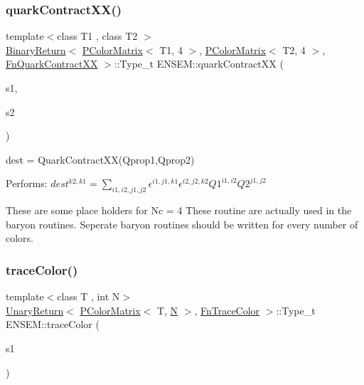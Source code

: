 \subsubsection{\texorpdfstring{quarkContractXX()}{quarkContractXX()}\hspace{0.1cm}{\footnotesize\ttfamily [4/4]}}
{\footnotesize\ttfamily template$<$class T1 , class T2 $>$ \\
\mbox{\hyperlink{structENSEM_1_1BinaryReturn}{Binary\+Return}}$<$ \mbox{\hyperlink{classENSEM_1_1PColorMatrix}{P\+Color\+Matrix}}$<$ T1, 4 $>$, \mbox{\hyperlink{classENSEM_1_1PColorMatrix}{P\+Color\+Matrix}}$<$ T2, 4 $>$, \mbox{\hyperlink{structENSEM_1_1FnQuarkContractXX}{Fn\+Quark\+Contract\+XX}} $>$\+::Type\+\_\+t E\+N\+S\+E\+M\+::quark\+Contract\+XX (\begin{DoxyParamCaption}\item[{const \mbox{\hyperlink{classENSEM_1_1PColorMatrix}{P\+Color\+Matrix}}$<$ T1, 4 $>$ \&}]{s1,  }\item[{const \mbox{\hyperlink{classENSEM_1_1PColorMatrix}{P\+Color\+Matrix}}$<$ T2, 4 $>$ \&}]{s2 }\end{DoxyParamCaption})\hspace{0.3cm}{\ttfamily [inline]}}



dest = Quark\+Contract\+X\+X(\+Qprop1,\+Qprop2) 

Performs\+: $dest^{k2,k1} = \sum_{i1,i2,j1,j2} \epsilon^{i1,j1,k1}\epsilon^{i2,j2,k2} Q1^{i1,i2} Q2^{j1,j2}$

These are some place holders for Nc = 4 These routine are actually used in the baryon routines. Seperate baryon routines should be written for every number of colors. \mbox{\label{group__primcolormatrix_ga00fd94578bee0c90e298c41c144c15ee}} 
\subsubsection{\texorpdfstring{traceColor()}{traceColor()}}
{\footnotesize\ttfamily template$<$class T , int N$>$ \\
\mbox{\hyperlink{structENSEM_1_1UnaryReturn}{Unary\+Return}}$<$ \mbox{\hyperlink{classENSEM_1_1PColorMatrix}{P\+Color\+Matrix}}$<$ T, \mbox{\hyperlink{adat__devel_2lib_2hadron_2operator__name__util_8cc_a7722c8ecbb62d99aee7ce68b1752f337}{N}} $>$, \mbox{\hyperlink{structENSEM_1_1FnTraceColor}{Fn\+Trace\+Color}} $>$\+::Type\+\_\+t E\+N\+S\+E\+M\+::trace\+Color (\begin{DoxyParamCaption}\item[{const \mbox{\hyperlink{classENSEM_1_1PColorMatrix}{P\+Color\+Matrix}}$<$ T, \mbox{\hyperlink{adat__devel_2lib_2hadron_2operator__name__util_8cc_a7722c8ecbb62d99aee7ce68b1752f337}{N}} $>$ \&}]{s1 }\end{DoxyParamCaption})\hspace{0.3cm}{\ttfamily [inline]}}

